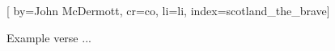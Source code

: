 
[%
    by={John McDermott},
    cr={co},
    li={li},
    index={scotland_the_brave}]


    \label{scotland_the_brave}

    \beginverse
        Example verse ...
    \endverse
\endsong
